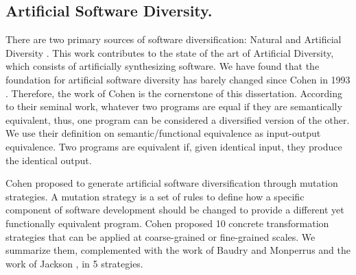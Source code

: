 \subsection*{Artificial Software Diversity.}

There are two primary sources of software diversification: Natural and Artificial Diversity \cite{natural_diversity}. This work contributes to the state of the art of Artificial Diversity, which consists of artificially synthesizing software. 
We have found that the foundation for artificial software diversity has barely changed since Cohen in 1993 \cite{cohen1993operating}. Therefore, the work of Cohen is the cornerstone of this dissertation.
According to their seminal work, whatever two programs are equal if they are semantically equivalent, thus, one program can be considered a diversified version of the other. 
We use their definition on semantic/functional equivalence as input-output equivalence. Two programs are equivalent if, given identical input, they produce the identical output. 

Cohen \etal proposed to generate artificial software diversification through mutation strategies.
A mutation strategy is a set of rules to define how a specific component of software development should be changed to provide a different yet functionally equivalent program. Cohen \etal proposed 10 concrete transformation strategies that can be applied at coarse-grained or fine-grained scales. We summarize them, complemented with the work of Baudry and Monperrus \cite{natural_diversity} and the work of Jackson \etal \cite{jackson}, in 5 strategies.






